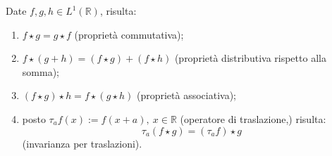 \begin{lemma}
    Date $f, g, h \in L^1(\mathbb{R})$, risulta:
    
    \begin{enumerate}
        \item $f \star g = g \star f$ (proprietà commutativa);
        \item $f \star (g + h) = (f \star g) + (f \star h)$ (proprietà
              distributiva rispetto alla somma);
        \item $(f \star g) \star h = f \star (g \star h)$ (proprietà
              associativa);
        \item posto $\tau_a f(x) := f(x + a), \ x \in \mathbb{R}$ (operatore di
              traslazione,) risulta:
              $$
                  \tau_a (f \star g) = (\tau_a f) \star g
              $$
              (invarianza per traslazioni).
    \end{enumerate}
\end{lemma}

